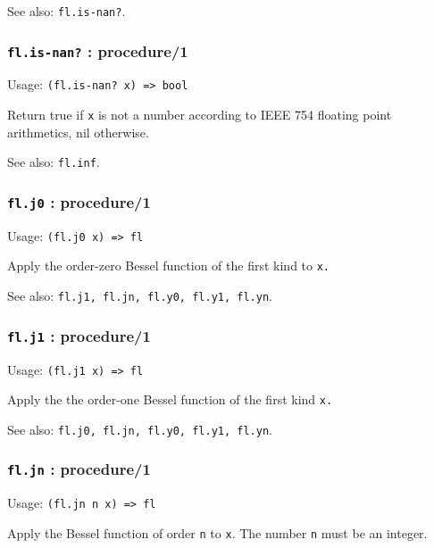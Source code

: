 \documentclass[
]{article}
\newcommand{\passthrough}[1]{#1}
\begin{document}
See also: \passthrough{\lstinline!fl.is-nan?!}.

\hypertarget{fl.is-nan-procedure1}{%
\subsubsection{\texorpdfstring{\texttt{fl.is-nan?} :
procedure/1}{fl.is-nan? : procedure/1}}\label{fl.is-nan-procedure1}}

Usage: \passthrough{\lstinline!(fl.is-nan? x) => bool!}

Return true if \passthrough{\lstinline!x!} is not a number according to
IEEE 754 floating point arithmetics, nil otherwise.

See also: \passthrough{\lstinline!fl.inf!}.

\hypertarget{fl.j0-procedure1}{%
\subsubsection{\texorpdfstring{\texttt{fl.j0} :
procedure/1}{fl.j0 : procedure/1}}\label{fl.j0-procedure1}}

Usage: \passthrough{\lstinline!(fl.j0 x) => fl!}

Apply the order-zero Bessel function of the first kind to
\passthrough{\lstinline!x.!}

See also: \passthrough{\lstinline!fl.j1, fl.jn, fl.y0, fl.y1, fl.yn!}.

\hypertarget{fl.j1-procedure1}{%
\subsubsection{\texorpdfstring{\texttt{fl.j1} :
procedure/1}{fl.j1 : procedure/1}}\label{fl.j1-procedure1}}

Usage: \passthrough{\lstinline!(fl.j1 x) => fl!}

Apply the the order-one Bessel function of the first kind
\passthrough{\lstinline!x.!}

See also: \passthrough{\lstinline!fl.j0, fl.jn, fl.y0, fl.y1, fl.yn!}.

\hypertarget{fl.jn-procedure1}{%
\subsubsection{\texorpdfstring{\texttt{fl.jn} :
procedure/1}{fl.jn : procedure/1}}\label{fl.jn-procedure1}}

Usage: \passthrough{\lstinline!(fl.jn n x) => fl!}

Apply the Bessel function of order \passthrough{\lstinline!n!} to
\passthrough{\lstinline!x!}. The number \passthrough{\lstinline!n!} must
be an integer.
\end{document}
